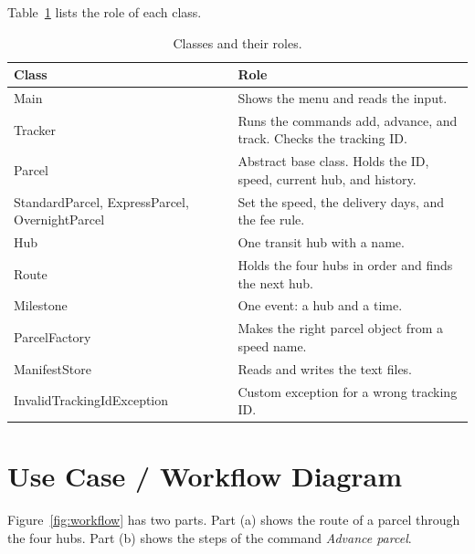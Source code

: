 Table~\ref{tab:classes} lists the role of each class.

\begin{table}[h]
\centering
\caption{Classes and their roles.}
\label{tab:classes}
\renewcommand{\arraystretch}{1.3}
\begin{tabularx}{\textwidth}{|p{}|X|}
\hline
\textbf{Class} & \textbf{Role}\\
\hline
Main & Shows the menu and reads the input.\\
\hline
Tracker & Runs the commands add, advance, and track. Checks the tracking ID.\\
\hline
Parcel & Abstract base class. Holds the ID, speed, current hub, and history.\\
\hline
StandardParcel, ExpressParcel, OvernightParcel & Set the speed, the delivery days, and the fee rule.\\
\hline
Hub & One transit hub with a name.\\
\hline
Route & Holds the four hubs in order and finds the next hub.\\
\hline
Milestone & One event: a hub and a time.\\
\hline
ParcelFactory & Makes the right parcel object from a speed name.\\
\hline
ManifestStore & Reads and writes the text files.\\
\hline
Invalid\-Tracking\-Id\-Exception & Custom exception for a wrong tracking ID.\\
\hline
\end{tabularx}
\end{table}

\section{Use Case / Workflow Diagram}
Figure~\ref{fig:workflow} has two parts. Part (a) shows the route of a parcel
through the four hubs. Part (b) shows the steps of the command
\textit{Advance parcel}.

